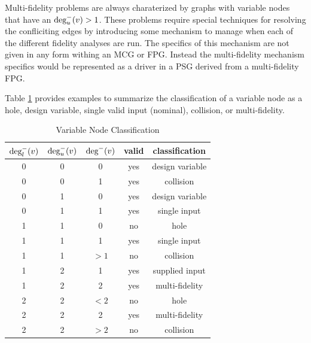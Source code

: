   Multi-fidelity problems are always charaterized by graphs with variable 
  nodes that have an $\textrm{deg}^-_u(v) > 1$. These problems require 
  special techniques for resolving the confliciting edges by introducing some mechanism
  to manage when each of the different fidelity analyses are 
  run\cite{march2012provably,alexandrov2001approximation,Huang_Allen_Notz_Miller_2006}.
  The specifics of this mechanism are not given in any form withing an MCG or 
  FPG. Instead the multi-fidelity mechanism specifics would be represented as a 
  driver in a PSG derived from a multi-fidelity FPG. 

Table \ref{t:variable node classification} provides examples to summarize the classification of a variable node as a hole, design variable, single valid input (nominal), collision, or multi-fidelity.

\begin{table}[htbp]
  \centering
  \caption{Variable Node Classification}
    \begin{tabular}{ccccc}
    \toprule
    $\textrm{deg}^-_l(v)$ & $\textrm{deg}^-_u(v)$ & $\textrm{deg}^-(v)$ & valid & classification \\
    \midrule
    0     & 0     & 0     & yes   & design variable \\
    0     & 0     & 1     & yes   & collision \\
    0     & 1     & 0     & yes   & design variable \\
    0     & 1     & 1     & yes   & single input \\
    1     & 1     & 0     & no    & hole \\
    1     & 1     & 1     & yes   & single input \\
    1     & 1     & $>1$ & no    & collision \\
    1     & 2     & 1     & yes   & supplied input \\
    1     & 2     & 2     & yes   & multi-fidelity \\
    2     & 2     & $<2$ & no    & hole \\
    2     & 2     & 2     & yes   & multi-fidelity \\
    2     & 2     & $>2$     & no   & collision \\
    \bottomrule
    \end{tabular}%
  \label{t:variable node classification}%
\end{table}%




